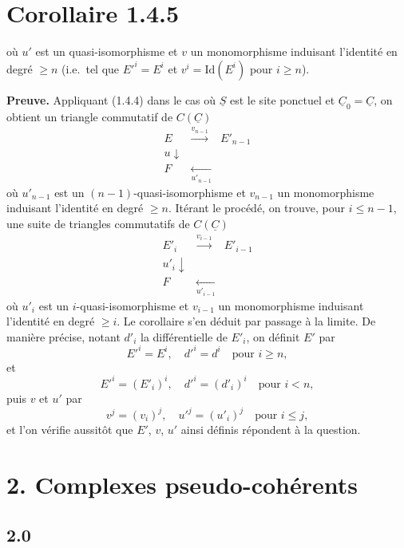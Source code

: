 \section*{Corollaire 1.4.5}

où $u'$ est un quasi-isomorphisme et $v$ un monomorphisme induisant l'identité en degré $\geqslant n$ (i.e.\ tel que $E'^i = E^i$ et $v^i = \mathrm{Id}(E^i)$ pour $i \geqslant n$).

\textbf{Preuve.} Appliquant (1.4.4) dans le cas où $\underline{S}$ est le site ponctuel et $\underline{C}_0 = \underline{C}$, on obtient un triangle commutatif de $C(\underline{C})$
\[
\begin{array}{ccc}
E & \xrightarrow{v_{n-1}} & E'_{n-1} \\
u \downarrow & & \\
F & \underset{u'_{n-1}}{\longleftarrow} &
\end{array}
\]
où $u'_{n-1}$ est un $(n-1)$-quasi-isomorphisme et $v_{n-1}$ un monomorphisme induisant l'identité en degré $\geqslant n$. Itérant le procédé, on trouve, pour $i \leqslant n-1$, une suite de triangles commutatifs de $C(\underline{C})$
\[
\begin{array}{ccc}
E'_i & \xrightarrow{v_{i-1}} & E'_{i-1} \\
u'_i \downarrow & & \\
F & \underset{u'_{i-1}}{\longleftarrow} &
\end{array}
\]
où $u'_i$ est un $i$-quasi-isomorphisme et $v_{i-1}$ un monomorphisme induisant l'identité en degré $\geqslant i$. Le corollaire s'en déduit par passage à la limite. De manière précise, notant $d'_i$ la différentielle de $E'_i$, on définit $E'$ par
\[
E'^i = E^i, \quad d'^i = d^i \quad \text{pour } i \geqslant n,
\]
et
\[
E'^i = (E'_i)^i, \quad d'^i = (d'_i)^i \quad \text{pour } i < n,
\]
puis $v$ et $u'$ par
\[
v^j = (v_i)^j, \quad u'^j = (u'_i)^j \quad \text{pour } i \leqslant j,
\]
et l'on vérifie aussitôt que $E'$, $v$, $u'$ ainsi définis répondent à la question.

\section*{2. Complexes pseudo-cohérents}

\subsection*{2.0}

